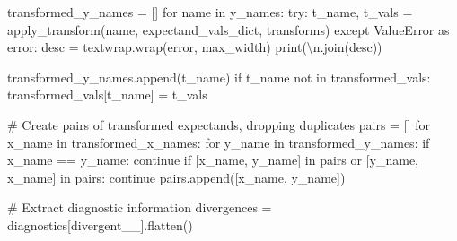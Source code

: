 \documentclass[
  letterpaper,
  DIV=11,
  numbers=noendperiod]{scrartcl}
\newenvironment{Shaded}{\begin{snugshade}}{\end{snugshade}}
\newcommand{\BuiltInTok}[1]{\textcolor[rgb]{0.00,0.23,0.31}{#1}}
\newcommand{\CharTok}[1]{\textcolor[rgb]{0.13,0.47,0.30}{#1}}
\newcommand{\CommentTok}[1]{\textcolor[rgb]{0.37,0.37,0.37}{#1}}
\newcommand{\ControlFlowTok}[1]{\textcolor[rgb]{0.00,0.23,0.31}{#1}}
\newcommand{\ImportTok}[1]{\textcolor[rgb]{0.00,0.46,0.62}{#1}}
\newcommand{\KeywordTok}[1]{\textcolor[rgb]{0.00,0.23,0.31}{#1}}
\newcommand{\NormalTok}[1]{\textcolor[rgb]{0.00,0.23,0.31}{#1}}
\newcommand{\OperatorTok}[1]{\textcolor[rgb]{0.37,0.37,0.37}{#1}}
\newcommand{\PreprocessorTok}[1]{\textcolor[rgb]{0.68,0.00,0.00}{#1}}
\newcommand{\StringTok}[1]{\textcolor[rgb]{0.13,0.47,0.30}{#1}}
\begin{document}
\begin{Shaded}
\begin{Highlighting}[]
\NormalTok{  transformed\_y\_names }\OperatorTok{=}\NormalTok{ []}
  \ControlFlowTok{for}\NormalTok{ name }\KeywordTok{in}\NormalTok{ y\_names:}
    \ControlFlowTok{try}\NormalTok{:}
\NormalTok{      t\_name, t\_vals }\OperatorTok{=}\NormalTok{ apply\_transform(name,}
\NormalTok{                                       expectand\_vals\_dict,}
\NormalTok{                                       transforms)}
    \ControlFlowTok{except} \PreprocessorTok{ValueError} \ImportTok{as}\NormalTok{ error:}
\NormalTok{      desc }\OperatorTok{=}\NormalTok{ textwrap.wrap(error, max\_width)}
      \BuiltInTok{print}\NormalTok{(}\StringTok{\textquotesingle{}}\CharTok{\textbackslash{}n}\StringTok{\textquotesingle{}}\NormalTok{.join(desc))}

\NormalTok{    transformed\_y\_names.append(t\_name)}
    \ControlFlowTok{if}\NormalTok{ t\_name }\KeywordTok{not} \KeywordTok{in}\NormalTok{ transformed\_vals:}
\NormalTok{      transformed\_vals[t\_name] }\OperatorTok{=}\NormalTok{ t\_vals}

  \CommentTok{\# Create pairs of transformed expectands, dropping duplicates}
\NormalTok{  pairs }\OperatorTok{=}\NormalTok{ []}
  \ControlFlowTok{for}\NormalTok{ x\_name }\KeywordTok{in}\NormalTok{ transformed\_x\_names:}
    \ControlFlowTok{for}\NormalTok{ y\_name }\KeywordTok{in}\NormalTok{ transformed\_y\_names:}
      \ControlFlowTok{if}\NormalTok{ x\_name }\OperatorTok{==}\NormalTok{ y\_name:}
        \ControlFlowTok{continue}
      \ControlFlowTok{if}\NormalTok{ [x\_name, y\_name] }\KeywordTok{in}\NormalTok{ pairs }\KeywordTok{or}\NormalTok{ [y\_name, x\_name] }\KeywordTok{in}\NormalTok{ pairs:}
        \ControlFlowTok{continue}
\NormalTok{      pairs.append([x\_name, y\_name])}

  \CommentTok{\# Extract diagnostic information}
\NormalTok{  divergences }\OperatorTok{=}\NormalTok{ diagnostics[}\StringTok{\textquotesingle{}divergent\_\_\textquotesingle{}}\NormalTok{].flatten()}


\end{Highlighting}
\end{Shaded}
\end{document}
